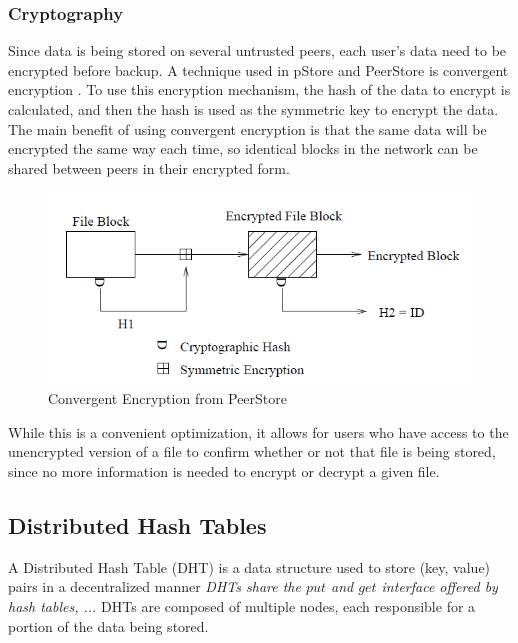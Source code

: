 \documentclass[a4paper]{article}
\begin{document}
\subsubsection{Cryptography}
Since data is being stored on several untrusted peers, each user's data need to be encrypted before backup. A technique used in pStore and PeerStore is convergent encryption \cite{pStore, PeerStore}. To use this encryption mechanism, the hash of the data to encrypt is calculated, and then the hash is used as the symmetric key to encrypt the data. The main benefit of using convergent encryption is that the same data will be encrypted the same way each time, so identical blocks in the network can be shared between peers in their encrypted form.

\begin{figure}
  \centering
  \includegraphics[scale=0.75]{ConvergentEncryption}
  \caption{Convergent Encryption from PeerStore}
\end{figure}

While this is a convenient optimization, it allows for users who have access to the unencrypted version of a file to confirm whether or not that file is being stored, since no more information is needed to encrypt or decrypt a given file.
\subsection{Distributed Hash Tables}

A Distributed Hash Table (DHT) is a data structure used to store (key, value) pairs in a decentralized manner \textit{DHTs share the $put$ and $get$ interface offered by hash tables, ...} DHTs are composed of multiple nodes, each responsible for a portion of the data being stored. 
\end{document}
